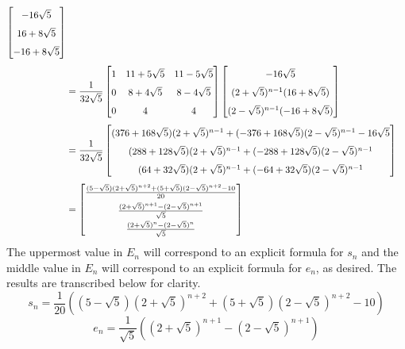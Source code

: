 \documentclass[titlepage]{article}
\begin{document}
\begin{align*}
    \begin{bmatrix}
        -16\sqrt{5}\\
        16+8\sqrt{5}\\
        -16+8\sqrt{5}\\
    \end{bmatrix}\\
    &= \frac{1}{32\sqrt{5}}
    \begin{bmatrix}
        1 & 11+5\sqrt{5} & 11-5\sqrt{5}\\
        0 & 8+4\sqrt{5} & 8-4\sqrt{5}\\
        0 & 4 & 4\\
    \end{bmatrix}
    \begin{bmatrix}
        -16\sqrt{5}\\
        (2+\sqrt{5})^{n-1}(16+8\sqrt{5})\\
        (2-\sqrt{5})^{n-1}(-16+8\sqrt{5})\\
    \end{bmatrix}\\
    &= \frac{1}{32\sqrt{5}}
    \begin{bmatrix}
        (376+168\sqrt{5})(2+\sqrt{5})^{n-1}+(-376+168\sqrt{5})(2-\sqrt{5})^{n-1}-16\sqrt{5}\\
        (288+128\sqrt{5})(2+\sqrt{5})^{n-1}+(-288+128\sqrt{5})(2-\sqrt{5})^{n-1}\\
        (64+32\sqrt{5})(2+\sqrt{5})^{n-1}+(-64+32\sqrt{5})(2-\sqrt{5})^{n-1}\\
    \end{bmatrix}\\
    &=
    \renewcommand{\arraystretch}{1.6}
    \begin{bmatrix}
        \frac{(5-\sqrt{5})(2+\sqrt{5})^{n+2}+(5+\sqrt{5})(2-\sqrt{5})^{n+2}-10}{20}\\
        \frac{(2+\sqrt{5})^{n+1}-(2-\sqrt{5})^{n+1}}{\sqrt{5}}\\
        \frac{(2+\sqrt{5})^n-(2-\sqrt{5})^n}{\sqrt{5}}\\
    \end{bmatrix}
\end{align*}
\endgroup
The uppermost value in $E_n$ will correspond to an explicit formula for $s_n$ and the middle value in $E_n$ will correspond to an explicit formula for $e_n$, as desired. The results are transcribed below for clarity.
\begin{equation}\label{eqn:s_n}
    s_n = \frac{1}{20}\left( (5-\sqrt{5})(2+\sqrt{5})^{n+2}+(5+\sqrt{5})(2-\sqrt{5})^{n+2}-10 \right)
\end{equation}
\begin{equation}\label{eqn:e_n}
    e_n = \frac{1}{\sqrt{5}}\left( (2+\sqrt{5})^{n+1}-(2-\sqrt{5})^{n+1} \right)
\end{equation}
\end{document}
